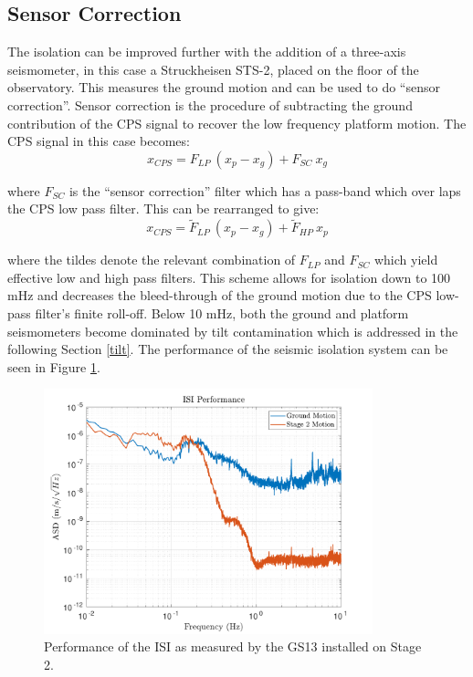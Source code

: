 \documentclass [12pt, proquest]{uwthesis}[2019]
\begin{document}
\subsection{Sensor Correction}\label{SensCor}

The isolation can be improved further with the addition of a three-axis seismometer, in this case a Struckheisen STS-2, placed on the floor of the observatory. This measures the ground motion and can be used to do ``sensor correction''. Sensor correction is the procedure of subtracting the ground contribution of the CPS signal to recover the low frequency platform motion. The CPS signal in this case becomes:
\begin{equation}
x_{CPS}=F_{LP}\ (x_p-x_g)+F_{SC}\ x_g
\end{equation}

where $F_{SC}$ is the ``sensor correction'' filter which has a pass-band which over laps the CPS low pass filter. This can be rearranged to give:
\begin{equation}
x_{CPS}=\tilde F_{LP}\ (x_p-x_g)+\tilde F_{HP}\ x_p
\end{equation}

where the tildes denote the relevant combination of $F_{LP}$ and $F_{SC}$ which yield effective low and high pass filters. This scheme allows for isolation down to 100 mHz and decreases the bleed-through of the  ground motion due to the CPS low-pass filter's finite roll-off. Below 10 mHz, both the ground and platform seismometers become dominated by tilt contamination which is addressed in the following Section \ref{tilt}. The performance of the seismic isolation system can be seen in Figure \ref{ISIPerf}.

\begin{figure}[!h]
\begin{center}
\includegraphics[width=0.85\textwidth]{ISIPerf.pdf}
\caption[Performance of the ISI]{Performance of the ISI as measured by the GS13 installed on Stage 2.}
\label{ISIPerf}
\end{center}
\end{figure}
\end{document}
